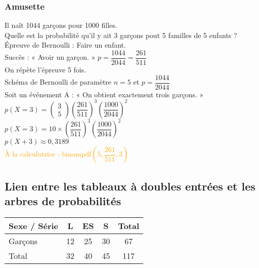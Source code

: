 \subsubsection{Amusette}

Il naît 1044 garçons pour 1000 filles. \\ Quelle est la probabilité qu'il y ait 3 garçons pout 5 familles de 5 enfants ? \\

Épreuve de Bernoulli : Faire un enfant. \\

Succès : « Avoir un garçon. » $p = \dfrac{1044}{2044} = \dfrac{261}{511} $ \\

On répète l'épreuve 5 fois. \\

Schéma de Bernoulli de paramètre $n = 5 $ et $p = \dfrac{1044}{2044} $ \\

Soit un événement A : « On obtient exactement trois garçons. » \\

$p\left(X = 3\right) = \left(\begin{array}{c} 3 \\ 5 \end{array}\right) \left(\dfrac{261}{511}\right)^3\left(\dfrac{1000}{2044}\right)^2$ \\

$p\left(X=3\right) = 10 \times \left(\dfrac{261}{511}\right)^3\left(\dfrac{1000}{2044}\right)^2 $ \\

$ p\left(X+3\right)  \approx 0,3189 $ \\


\textcolor{orange} {À la calculatrice : $\mathrm{binompdf} \left(5,\dfrac{261}{511},3\right)$} 

\newpage

\subsection{Lien entre les tableaux à  doubles entrées et les arbres de probabilités}


\begin{tabular}{|l|c|c|c|c|}
\hline
Sexe / Série & L & ES & S & Total \\
\hline
Garçons & 12 & 25 & 30 & 67 \\
\hline
Total & 32 & 40 & 45 & 117 \\
\hline
\end{tabular}

